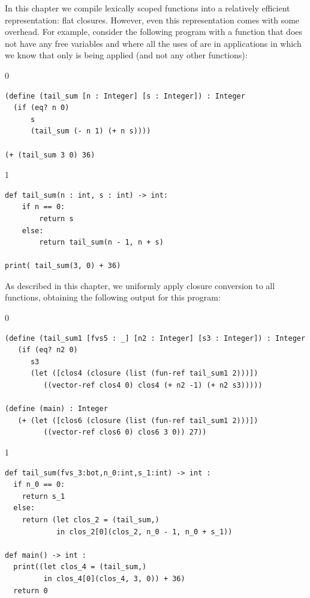 \documentclass[7x10]{TimesAPriori_MIT}%
\def\racketEd{0}
\def\pythonEd{1}
\def\edition{1}
\newcommand{\pythonColor}[0]{}
\numberwithin{theorem}{chapter}
\numberwithin{definition}{chapter}
\numberwithin{equation}{chapter}
\begin{document}
In this chapter we compile lexically scoped functions into a
relatively efficient representation: flat closures. However, even this
representation comes with some overhead. For example, consider the
following program with a function  that does not have
any free variables and where all the uses of  are in
applications in which we know that only  is being applied
(and not any other functions):
\begin{center}
\begin{minipage}{0.95\textwidth}
{\if\edition\racketEd  
\begin{lstlisting}
(define (tail_sum [n : Integer] [s : Integer]) : Integer
  (if (eq? n 0)
      s
      (tail_sum (- n 1) (+ n s))))

(+ (tail_sum 3 0) 36)
\end{lstlisting}
\fi}
{\if\edition\pythonEd\pythonColor
\begin{lstlisting}
def tail_sum(n : int, s : int) -> int:
    if n == 0:
        return s
    else:
        return tail_sum(n - 1, n + s)

print( tail_sum(3, 0) + 36)
\end{lstlisting}
\fi}
\end{minipage}
\end{center}
As described in this chapter, we uniformly apply closure conversion to
all functions, obtaining the following output for this program:
\begin{center}
\begin{minipage}{0.95\textwidth}
{\if\edition\racketEd  
\begin{lstlisting}
(define (tail_sum1 [fvs5 : _] [n2 : Integer] [s3 : Integer]) : Integer
   (if (eq? n2 0)
      s3
      (let ([clos4 (closure (list (fun-ref tail_sum1 2)))])
         ((vector-ref clos4 0) clos4 (+ n2 -1) (+ n2 s3)))))

(define (main) : Integer
   (+ (let ([clos6 (closure (list (fun-ref tail_sum1 2)))])
         ((vector-ref clos6 0) clos6 3 0)) 27))
\end{lstlisting}
\fi}
{\if\edition\pythonEd\pythonColor
\begin{lstlisting}
def tail_sum(fvs_3:bot,n_0:int,s_1:int) -> int :
  if n_0 == 0:
    return s_1
  else:
    return (let clos_2 = (tail_sum,)
            in clos_2[0](clos_2, n_0 - 1, n_0 + s_1))

def main() -> int :
  print((let clos_4 = (tail_sum,)
         in clos_4[0](clos_4, 3, 0)) + 36)
  return 0
\end{lstlisting}
\fi}
\end{minipage}
\end{center}
\end{document}
